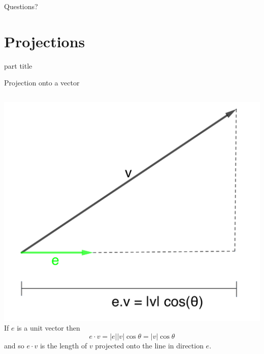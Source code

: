 \documentclass{beamer}
\begin{document}
\begin{frame}
  Questions?
\end{frame}

\section{Projections}

\begin{frame}
  \begin{beamercolorbox}[sep=12pt,center]{part title}
    \insertsection\par
  \end{beamercolorbox}
\end{frame}

\begin{frame}{Projection onto a vector}
  \begin{columns}
    \includegraphics[scale=1.7]{projection-onto-unit.png}
    If $e$ is a unit vector then
    \begin{equation*}
      e\cdot v = |e||v|\cos \theta = |v|\cos \theta
    \end{equation*}
    and so $e\cdot v$ is the length of $v$ projected onto the line in direction $e$.
  \end{columns}
\end{frame}
\end{document}
